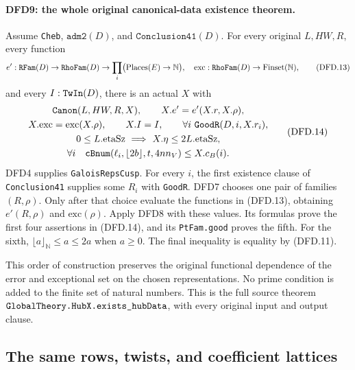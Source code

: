 \documentclass[11pt,a4paper]{article}
\numberwithin{equation}{section}
\theoremstyle{remark}\newtheorem{remark}[theorem]{Remark}
\begin{document}
\paragraph{DFD9: the whole original canonical-data existence theorem.}
\label{claim:DFD9}
Assume \texttt{Cheb}, $\texttt{adm2}(D)$, and
$\texttt{Conclusion41}(D)$. For every original $L,HW,R$,
every function
\[
 e':\texttt{RFam}(D)\to\texttt{Rho\allowbreak Fam}(D)\to
          \prod_i\bigl(\operatorname{Places}(E)\to\mathbb N\bigr),
 \quad
 \mathrm{exc}:\texttt{Rho\allowbreak Fam}(D)\to\operatorname{Finset}(\mathbb N),
                                                               \tag{DFD.13}
\]
and every $I:\texttt{Tw\allowbreak In}(D)$, there is an actual $X$ with
\[
 \begin{gathered}
 \texttt{Canon}(L,HW,R,X),\qquad X.e'=e'(X.r,X.\rho),\\
 X.\mathrm{exc}=\mathrm{exc}(X.\rho),\qquad X.I=I,
 \qquad\forall i\ \texttt{Good\allowbreak R}(D,i,X.r_i),\\
 0\le L.\mathrm{etaSz}\ \Longrightarrow\
          X.\eta\le2L.\mathrm{etaSz},\\
 \forall i\quad
 \texttt{c\allowbreak Bnum}(\ell_i,\lfloor2b\rfloor,t,4nn_V)\le X.c_B(i).
 \end{gathered}                                         \tag{DFD.14}
\]
DFD4 supplies \texttt{Galois\allowbreak Reps\allowbreak Cusp}. For every $i$, the
first existence clause of \texttt{Conclusion41} supplies
some $R_i$ with \texttt{Good\allowbreak R}. DFD7 chooses one pair of
families $(R,\rho)$. Only after that choice evaluate the
functions in (DFD.13), obtaining $e'(R,\rho)$ and
$\mathrm{exc}(\rho)$. Apply DFD8 with these values.
Its formulas prove the first four assertions in (DFD.14),
and its \texttt{Pt\allowbreak Fam.\allowbreak good} proves the fifth. For the sixth,
$\lfloor a\rfloor_{\mathbb N}\le a\le2a$ when $a\ge0$.
The final inequality is equality by (DFD.11).

This order of construction preserves the original functional
dependence of the error and exceptional set on the chosen
representations. No prime condition is added to the finite
set of natural numbers. This is the full source theorem
$\texttt{Global\allowbreak Theory.\allowbreak Hub\allowbreak X.\allowbreak exists\_\allowbreak hub\allowbreak Data}$, with every
original input and output clause.

\subsection{The same rows, twists, and coefficient lattices}
\end{document}
